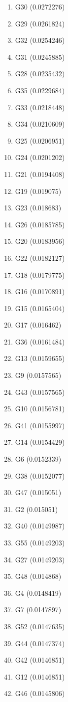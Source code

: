 \begin{enumerate}
\item G30 (0.0272276)
\item G29 (0.0261824)
\item G32 (0.0254246)
\item G31 (0.0245885)
\item G28 (0.0235432)
\item G35 (0.0229684)
\item G33 (0.0218448)
\item G34 (0.0210609)
\item G25 (0.0206951)
\item G24 (0.0201202)
\item G21 (0.0194408)
\item G19 (0.019075)
\item G23 (0.018683)
\item G26 (0.0185785)
\item G20 (0.0183956)
\item G22 (0.0182127)
\item G18 (0.0179775)
\item G16 (0.0170891)
\item G15 (0.0165404)
\item G17 (0.016462)
\item G36 (0.0161484)
\item G13 (0.0159655)
\item G9 (0.0157565)
\item G43 (0.0157565)
\item G10 (0.0156781)
\item G41 (0.0155997)
\item G14 (0.0154429)
\item G6 (0.0152339)
\item G38 (0.0152077)
\item G47 (0.015051)
\item G2 (0.015051)
\item G40 (0.0149987)
\item G55 (0.0149203)
\item G27 (0.0149203)
\item G48 (0.014868)
\item G4 (0.0148419)
\item G7 (0.0147897)
\item G52 (0.0147635)
\item G44 (0.0147374)
\item G42 (0.0146851)
\item G12 (0.0146851)
\item G46 (0.0145806)

\end{enumerate}
